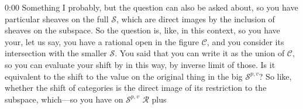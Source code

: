\begin{unfinished}{0:00}
Something I probably, but the question can also be asked about, so you have particular sheaves on the full $\mathcal{S}$, which are direct images by the inclusion of sheaves on the subspace. So the question is, like, in this context, so you have your, let us say, you have a rational open in the figure $\mathcal{C}$, and you consider its intersection with the smaller $\mathcal{S}$. You said that you can write it as the union of $\mathcal{C}$, so you can evaluate your shift by in this way, by inverse limit of those. Is it equivalent to the shift to the value on the original thing in the big $\mathcal{S}^{p,v}$? So like, whether the shift of categories is the direct image of its restriction to the subspace, which---so you have on $\mathcal{S}^{p,v}$ $\mathcal{R}$ plus

\end{unfinished}
